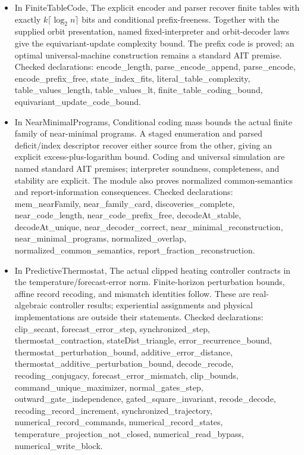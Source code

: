 \documentclass[11pt,a4paper]{article}
\newcommand{\lean}[1]{{\ttfamily\small
  \let\leanunderscore\_\def\_{\leanunderscore\allowbreak}#1}}
\begin{document}
\begin{itemize}[leftmargin=1.4em,itemsep=1pt]
\item {\raggedright In \lean{FiniteTableCode}, The explicit encoder and parser recover finite tables with exactly $k\lceil\log_2 n\rceil$ bits and conditional prefix-freeness. Together with the supplied orbit presentation, named fixed-interpreter and orbit-decoder laws give the equivariant-update complexity bound. The prefix code is proved; an optimal universal-machine construction remains a standard AIT premise.
Checked declarations: \lean{encode\_length}, \lean{parse\_encode\_append}, \lean{parse\_encode}, \lean{encode\_prefix\_free}, \lean{state\_index\_fits}, \lean{literal\_table\_complexity}, \lean{table\_values\_length}, \lean{table\_values\_lt}, \lean{finite\_table\_coding\_bound}, \lean{equivariant\_update\_code\_bound}.\par}
\item {\raggedright In \lean{NearMinimalPrograms}, Conditional coding mass bounds the actual finite family of near-minimal programs. A staged enumeration and parsed deficit/index descriptor recover either source from the other, giving an explicit excess-plus-logarithm bound. Coding and universal simulation are named standard AIT premises; interpreter soundness, completeness, and stability are explicit. The module also proves normalized common-semantics and report-information consequences.
Checked declarations: \lean{mem\_nearFamily}, \lean{near\_family\_card}, \lean{discoveries\_complete}, \lean{near\_code\_length}, \lean{near\_code\_prefix\_free}, \lean{decodeAt\_stable}, \lean{decodeAt\_unique}, \lean{near\_decoder\_correct}, \lean{near\_minimal\_reconstruction}, \lean{near\_minimal\_programs}, \lean{normalized\_overlap}, \lean{normalized\_common\_semantics}, \lean{report\_fraction\_reconstruction}.\par}
\item {\raggedright In \lean{PredictiveThermostat}, The actual clipped heating controller contracts in the temperature/forecast-error norm. Finite-horizon perturbation bounds, affine record recoding, and mismatch identities follow. These are real-algebraic controller results; experiential assignments and physical implementations are outside their statements.
Checked declarations: \lean{clip\_secant}, \lean{forecast\_error\_step}, \lean{synchronized\_step}, \lean{thermostat\_contraction}, \lean{stateDist\_triangle}, \lean{error\_recurrence\_bound}, \lean{thermostat\_perturbation\_bound}, \lean{additive\_error\_distance}, \lean{thermostat\_additive\_perturbation\_bound}, \lean{decode\_recode}, \lean{recoding\_conjugacy}, \lean{forecast\_error\_mismatch}, \lean{clip\_bounds}, \lean{command\_unique\_maximizer}, \lean{normal\_gates\_step}, \lean{outward\_gate\_independence}, \lean{gated\_square\_invariant}, \lean{recode\_decode}, \lean{recoding\_record\_increment}, \lean{synchronized\_trajectory}, \lean{numerical\_record\_commands}, \lean{numerical\_record\_states}, \lean{temperature\_projection\_not\_closed}, \lean{numerical\_read\_bypass}, \lean{numerical\_write\_block}.\par}

\end{itemize}
\end{document}
